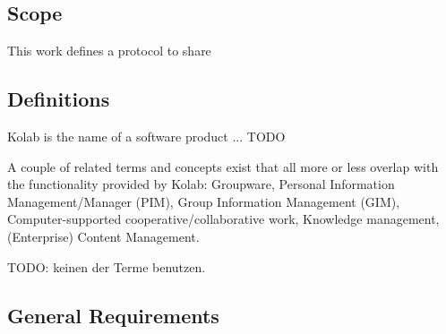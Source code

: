 \documentclass[12pt,a4paper]{scrartcl}		%
\begin{document}
\subsection{Scope}

This work defines a protocol to share 

\subsection{Definitions}

Kolab is the name of a software product ... TODO

A couple of related terms and concepts exist that all more or less overlap with
the functionality provided by Kolab: Groupware, Personal Information
Management/Manager (PIM), Group Information Management (GIM), Computer-supported
cooperative/collaborative work, Knowledge management, (Enterprise) Content
Management.

TODO: keinen der Terme benutzen.

\subsection{General Requirements}
\end{document}
